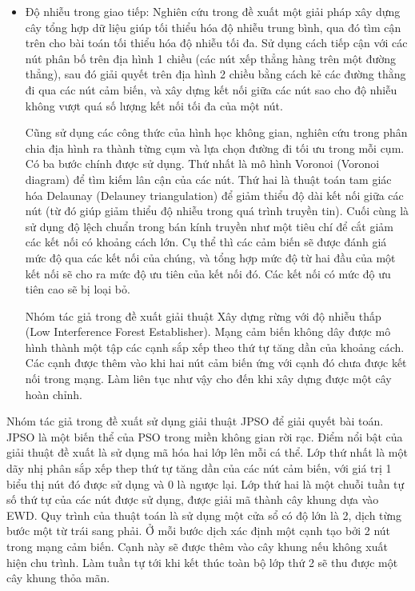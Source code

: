\documentclass{hust}
\begin{document}
\begin{itemize}
	\item Độ nhiễu trong giao tiếp: Nghiên cứu trong \cite{lou2011minimizing} đề xuất một giải pháp xây dựng cây tổng hợp dữ liệu giúp tối thiểu hóa độ nhiễu trung bình, qua đó tìm cận trên cho bài toán tối thiểu hóa độ nhiễu tối đa. Sử dụng cách tiếp cận với các nút phân bố trên địa hình 1 chiều (các nút xếp thẳng hàng trên một đường thẳng), sau đó giải quyết trên địa hình 2 chiều bằng cách kẻ các đường thằng đi qua các nút cảm biến, và xây dựng kết nối giữa các nút sao cho độ nhiễu không vượt quá số lượng kết nối tối đa của một nút.
	
	
	Cũng sử dụng các công thức của hình học không gian, nghiên cứu trong \cite{jang2010applications} phân chia địa hình ra thành từng cụm và lựa chọn đường đi tối ưu trong mỗi cụm. Có ba bước chính được sử dụng. Thứ nhất là mô hình Voronoi (Voronoi diagram) để tìm kiếm lân cận của các nút. Thứ hai là thuật toán tam giác hóa Delaunay (Delauney triangulation) để giảm thiểu độ dài kết nối giữa các nút (từ đó giúp giảm thiểu độ nhiễu trong quá trình truyền tin). Cuối cùng là sử dụng độ lệch chuẩn trong bán kính truyền như một tiêu chí để cắt giảm các kết nối có khoảng cách lớn. Cụ thể thì các cảm biến sẽ được đánh giá mức độ qua các kết nối của chúng, và tổng hợp mức độ từ hai đầu của một kết nối sẽ cho ra mức độ ưu tiên của kết nối đó. Các kết nối có mức độ ưu tiên cao sẽ bị loại bỏ.
	
	
	Nhóm tác giả trong \cite{burkhart2004does} đề xuất giải thuật Xây dựng rừng với độ nhiễu thấp (Low Interference Forest Establisher). Mạng cảm biến không dây được mô hình thành một tập các cạnh sắp xếp theo thứ tự tăng dần của khoảng cách. Các cạnh được thêm vào khi hai nút cảm biến ứng với cạnh đó chưa được kết nối trong mạng. Làm liên tục như vậy cho đến khi xây dựng được một cây hoàn chỉnh.
\end{itemize}


Nhóm tác giả trong \cite{lu2014construction} đề xuất sử dụng giải thuật \Gls{JPSO} để giải quyết bài toán. \Gls{JPSO} là một biến thể của \Gls{PSO} trong miền không gian rời rạc. Điểm nổi bật của giải thuật đề xuất là sử dụng mã hóa hai lớp lên mỗi cá thể. Lớp thứ nhất là một dãy nhị phân sắp xếp thep thứ tự tăng dần của các nút cảm biến, với giá trị 1 biểu thị nút đó được sử dụng và 0 là ngược lại. Lớp thứ hai là một chuỗi tuần tự số thứ tự của các nút được sử dụng, được giải mã thành cây khung dựa vào \Gls{EWD}. Quy trình của thuật toán là sử dụng một cửa sổ có độ lớn là 2, dịch từng bước một từ trái sang phải. Ở mỗi bước dịch xác định một cạnh tạo bởi 2 nút trong mạng cảm biến. Cạnh này sẽ được thêm vào cây khung nếu không xuất hiện chu trình. Làm tuần tự tới khi kết thúc toàn bộ lớp thứ 2 sẽ thu được một cây khung thỏa mãn.
\end{document}
